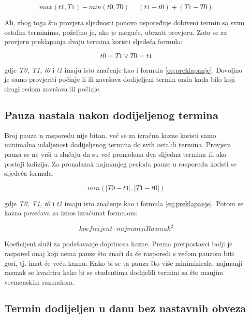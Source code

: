 \documentclass[times, utf8, zavrsni]{fer}
\begin{document}
\begin{equation}
max(t1, T1) - min(t0, T0) = (t1 - t0) + (T1  - T0)
\label{eq:slijednost-long}
\end{equation}

Ali, zbog toga što provjera sljednosti ponovo uspoređuje dobiveni termin sa svim ostalim terminima, poželjno je, ako je moguće, ubrzati provjeru. Zato se za provjeru preklapanja dvaju termina koristi sljedeća formula:

\begin{equation}
t0 = T1 \lor T0 = t1
\label{eq:slijednost-short}
\end{equation}

gdje \emph{T0, T1, t0} i \emph{t1} imaju isto značenje kao i formula \ref{eq:preklapanje}. Dovoljno je samo provjeriti počinje li ili završava dodijeljeni termin onda kada bilo koji drugi redom završava ili počinje.

\subsection{Pauza nastala nakon dodijeljenog termina}

Broj pauza u rasporedu nije bitan, već se za izračun kazne koristi samo minimalna udaljenost dodijeljenog termina do svih ostalih termina. Provjera pauza se ne vrši u slučaju da su već pronađena dva slijedna termina ili ako postoji kolizija. Za pronalazak najmanjeg perioda pauze u rasporedu koristi se sljedeća formula:

\begin{equation}
min(|T0 - t1|, |T1 - t0|)
\label{eq:min-rupa}
\end{equation}

\noindent
gdje \emph{T0, T1, t0} i \emph{t1} imaju isto značenje kao i formula \ref{eq:preklapanje}. Potom se kazna povećava za iznos izračunat formulom:

\begin{equation}
koeficijent \cdot najmanjiRazmak^2
\label{eq:min-rupa-kazna}
\end{equation}

Koeficijent služi za podešavanje doprinosa kazne. Prema pretpostavci bolji je raspored onaj koji nema pauze što znači da će rasporedi s većom pauzom biti gori, tj. imat će veću kaznu. Kako bi se ta pauza što više minimizirala, najmanji razmak se kvadrira kako bi se studentima dodijelili termini sa što manjim vremenskim razmakom.

\subsection{Termin dodijeljen u danu bez nastavnih obveza}
\end{document}

